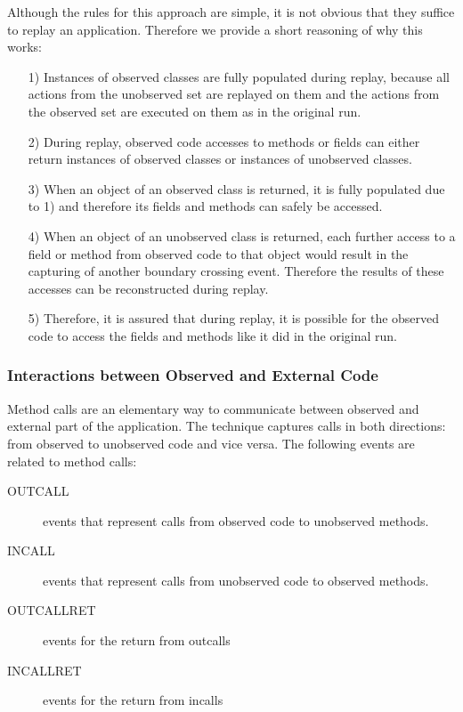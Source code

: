 Although the rules for this approach are simple, it is not obvious that they suffice to replay an application. Therefore we provide a short reasoning of why this works:

\begin{enumerate}
  \item [1)] Instances of observed classes are fully populated during replay, because all actions from the unobserved set are replayed on them and the actions from the observed set are executed on them as in the original run.
  \item [2)] During replay, observed code accesses to methods or fields can either return instances of observed classes or instances of unobserved classes.
  \item [3)] When an object of an observed class is returned, it is fully populated due to 1) and therefore its fields and methods can safely be accessed.
  \item [4)] When an object of an unobserved class is returned, each further access to a field or method from observed code to that object would result in the capturing of another boundary crossing event. Therefore the results of these accesses can be reconstructed during replay.
  \item [5)] Therefore, it is assured that during replay, it is possible for the observed code to access the fields and methods like it did in the original run.
\end{enumerate}



\subsubsection {Interactions between Observed and External Code}
Method calls are an elementary way to communicate between observed and external part of the application. The technique captures calls in both directions: from observed to unobserved code and vice versa. The following events are related to method calls:


\begin{description}
 \item  [OUTCALL] events that represent calls from observed code to unobserved methods.
 \item [INCALL] events that represent calls from unobserved code to observed methods.
 \item [OUTCALLRET] events for the return from outcalls
 \item [INCALLRET] events for the return from incalls
\end{description}


